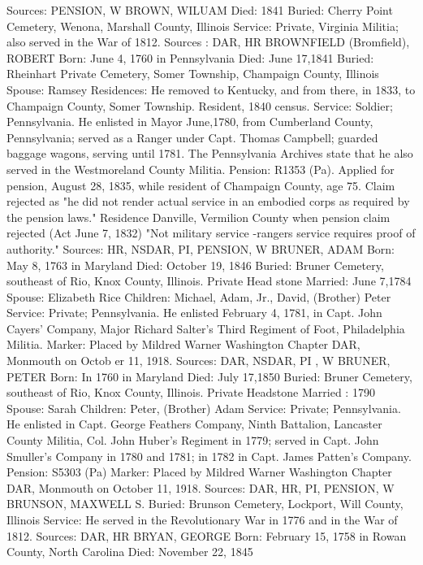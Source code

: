 Sources: PENSION, W 
BROWN, WILUAM 
Died: 1841 
Buried: Cherry Point Cemetery, Wenona, Marshall County, Illinois 
Service: Private, Virginia Militia; also served in the War of 1812. 
Sources : DAR, HR 
BROWNFIELD (Bromfield), ROBERT 
Born: June 4, 1760 in Pennsylvania 
Died: June 17,1841 
Buried: Rheinhart Private Cemetery, Somer Township, Champaign County, Illinois 
Spouse: Ramsey Residences: He removed to Kentucky, and from there, in 1833, to Champaign County, Somer Township. Resident, 1840 census. 
Service: Soldier; Pennsylvania. He enlisted in Mayor June,1780, from Cumber­land County, Pennsylvania; served as a Ranger under Capt. Thomas Camp­bell; guarded baggage wagons, serving until 1781. The Pennsylvania Archives state that he also served in the Westmoreland County Militia. 
Pension: R1353 (Pa). Applied for pension, August 28, 1835, while resident of Champaign County, age 75. Claim rejected as "he did not render actual service in an embodied corps as required by the pension laws." Residence Danville, Vermilion County when pension claim rejected (Act June 7, 1832) "Not military service -rangers service requires proof of authority." 
Sources: HR, NSDAR, PI, PENSION, W 
BRUNER, ADAM 
Born: May 8, 1763 in Maryland 
Died: October 19, 1846 
Buried: Bruner Cemetery, southeast of Rio, Knox County, Illinois. Private Head ­stone Married: June 7,1784 
Spouse: Elizabeth Rice 
Children: Michael, Adam, Jr., David, (Brother) Peter 
Service: Private; Pennsylvania. He enlisted February 4, 1781, in Capt. John Cayers' Company, Major Richard Salter's Third Regiment of Foot, Philadel­phia Militia. 
Marker: Placed by Mildred Warner Washington Chapter DAR, Monmouth on Octob er 11, 1918. 
Sources: DAR, NSDAR, PI , W 
BRUNER, PETER 
Born: In 1760 in Maryland 
Died: July 17,1850 
Buried: Bruner Cemetery, southeast of Rio, Knox County, Illinois. Private Head­stone 
Married : 1790 
Spouse: Sarah 
Children: Peter, (Brother) Adam 
Service: Private; Pennsylvania. He enlisted in Capt. George Feathers Company, Ninth Battalion, Lancaster County Militia, Col. John Huber's Regiment in 1779; served in Capt. John Smuller's Company in 1780 and 1781; in 1782 in Capt. James Patten's Company. 
Pension: S5303 (Pa) Marker: Placed by Mildred Warner Washington Chapter DAR, Monmouth on October 11, 1918. 
Sources: DAR, HR, PI, PENSION, W 
BRUNSON, MAXWELL S. 
Buried: Brunson Cemetery, Lockport, Will County, Illinois 
Service: He served in the Revolutionary War in 1776 and in the War of 1812. 
Sources: DAR, HR 
BRYAN, GEORGE 
Born: February 15, 1758 in Rowan County, North Carolina Died: November 22, 1845 
